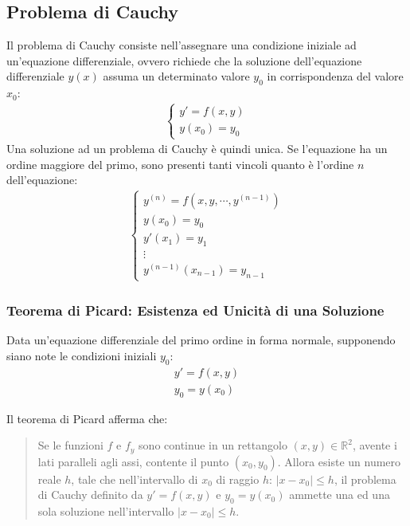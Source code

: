 \documentclass{article}
\numberwithin{equation}{subsection}
\begin{document}
\subsection{Problema di Cauchy}

Il problema di Cauchy consiste nell'assegnare una condizione iniziale ad un'equazione differenziale, ovvero richiede che la soluzione dell'equazione differenziale $y(x)$ assuma un determinato valore $y_0$ in corrispondenza del valore $x_0$:
\begin{gather}
    \begin{cases}
        y'=f(x,y)\\
        y(x_0)=y_0
    \end{cases}
\end{gather}
Una soluzione ad un problema di Cauchy è quindi unica. 
Se l'equazione ha un ordine maggiore del primo, sono presenti tanti vincoli quanto è l'ordine $n$ dell'equazione:
\begin{gather*}
    \begin{cases}
        y^{(n)}=f(x,y,\cdots,y^{(n-1)})\\
        y(x_0)=y_0\\
        y'(x_1)=y_1\\
        \vdots\\
        y^{(n-1)}(x_{n-1})=y_{n-1}
    \end{cases}
\end{gather*}

\subsubsection{Teorema di Picard: Esistenza ed Unicità di una Soluzione}

Data un'equazione differenziale del primo ordine in forma normale, supponendo siano note le condizioni iniziali $y_0$:
\begin{gather*}
    y'=f(x,y)\\
    y_0=y(x_0)
\end{gather*}

Il teorema di Picard afferma che:
\begin{quotation}
    Se le funzioni $f$ e $f_y$ sono continue in un rettangolo $(x,y)\in\mathbb{R}^2$, avente i lati paralleli agli assi, contente il punto $(x_0,y_0)$. Allora esiste un numero reale $h$, tale che nell'intervallo di $x_0$ di raggio $h$: $|x-x_0|\leq h$, il problema di Cauchy definito da $y'=f(x,y)$ e $y_0=y(x_0)$ ammette una ed una sola soluzione nell'intervallo $|x-x_0|\leq h$.      
\end{quotation}
\end{document}

